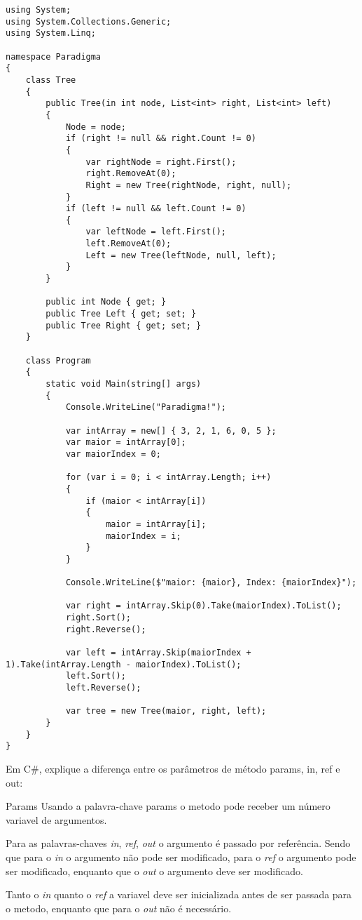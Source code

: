 \documentclass[a4 paper]{article}
\begin{document}
\begin{verbatim}
using System;
using System.Collections.Generic;
using System.Linq;

namespace Paradigma
{
    class Tree
    {
        public Tree(in int node, List<int> right, List<int> left)
        {
            Node = node;
            if (right != null && right.Count != 0)
            {
                var rightNode = right.First();
                right.RemoveAt(0);
                Right = new Tree(rightNode, right, null);
            }
            if (left != null && left.Count != 0)
            {
                var leftNode = left.First();
                left.RemoveAt(0);
                Left = new Tree(leftNode, null, left);
            }
        }

        public int Node { get; }
        public Tree Left { get; set; }
        public Tree Right { get; set; }
    }

    class Program
    {
        static void Main(string[] args)
        {
            Console.WriteLine("Paradigma!");

            var intArray = new[] { 3, 2, 1, 6, 0, 5 };
            var maior = intArray[0];
            var maiorIndex = 0;

            for (var i = 0; i < intArray.Length; i++)
            {
                if (maior < intArray[i])
                {
                    maior = intArray[i];
                    maiorIndex = i;
                }
            }

            Console.WriteLine($"maior: {maior}, Index: {maiorIndex}");

            var right = intArray.Skip(0).Take(maiorIndex).ToList();
            right.Sort();
            right.Reverse();

            var left = intArray.Skip(maiorIndex + 1).Take(intArray.Length - maiorIndex).ToList();
            left.Sort();
            left.Reverse();

            var tree = new Tree(maior, right, left);
        }
    }
}

\end{verbatim}

\vspace{5mm}

Em C\#, explique a diferença entre os parâmetros de método params, in, ref e out:

Params Usando a palavra-chave params o metodo pode receber um número variavel de argumentos.

Para as palavras-chaves \textit{in}, \textit{ref}, \textit{out} o argumento é passado por referência. Sendo que para o \textit{in}  o argumento não pode ser modificado, para o \textit{ref} o argumento pode ser modificado, enquanto que o \textit{out} o argumento deve ser modificado. 

Tanto o \textit{in} quanto o \textit{ref} a variavel deve ser inicializada antes de ser passada para o metodo, enquanto que para o \textit{out} não é necessário. 
\end{document}
